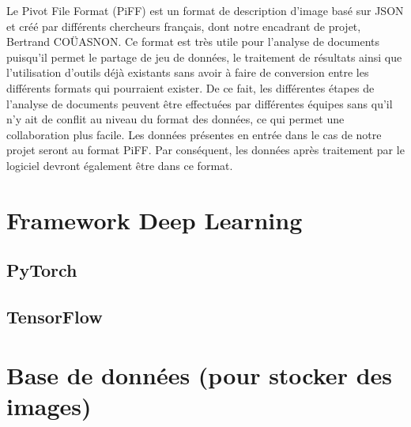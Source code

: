 Le Pivot File Format (PiFF) est un format de description d’image basé sur JSON et créé par différents
chercheurs français, dont notre encadrant de projet, Bertrand COÜASNON. Ce format est très utile pour l’analyse
de documents puisqu'il permet le partage de jeu de données, le traitement de résultats ainsi que
l’utilisation d’outils déjà existants sans avoir à faire de conversion entre les différents formats
qui pourraient exister. De ce fait, les différentes étapes de l’analyse de documents peuvent être effectuées
par différentes équipes sans qu’il n'y ait de conflit au niveau du format des données, ce qui permet une
collaboration plus facile. Les données présentes en entrée dans le cas de notre projet seront au format PiFF.
Par conséquent, les données après traitement par le logiciel devront également être dans ce format. 

\section{Framework Deep Learning}

\subsection{PyTorch}

\subsection{TensorFlow}

\section{Base de données (pour stocker des images)}
